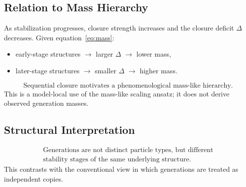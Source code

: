 \subsection{Relation to Mass Hierarchy}

As stabilization progresses,
closure strength increases and the closure deficit $\Delta$ decreases.
Given equation~\eqref{eq:mass}:
\begin{itemize}
  \item early-stage structures $\to$ larger $\Delta$ $\to$ lower mass,
  \item later-stage structures $\to$ smaller $\Delta$ $\to$ higher mass.
\end{itemize}
\begin{equation}
  \boxed{
    \text{Sequential closure motivates a phenomenological mass-like hierarchy.}
  }
\end{equation}
This is a model-local use of the mass-like scaling ansatz; it does not derive
observed generation masses.

\subsection{Structural Interpretation}

\begin{equation}
  \boxed{\begin{gathered}
    \text{Generations are not distinct particle types, but different} \\
    \text{stability stages of the same underlying structure.}
  \end{gathered}}
\end{equation}
This contrasts with the conventional view in which generations are treated
as independent copies.
